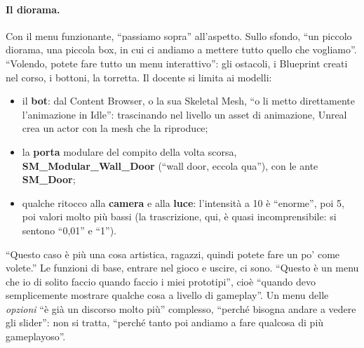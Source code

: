 \paragraph{Il diorama.} Con il menu funzionante, ``passiamo sopra'' all'aspetto. Sullo
sfondo, ``un piccolo diorama, una piccola box, in cui ci andiamo a mettere tutto quello che
vogliamo''. ``Volendo, potete fare tutto un menu interattivo'': gli ostacoli, i Blueprint
creati nel corso, i bottoni, la torretta. Il docente si limita ai modelli:
\begin{itemize}
  \item il \textbf{bot}: dal Content Browser, o la sua Skeletal Mesh, ``o li metto
        direttamente l'animazione in Idle'': trascinando nel livello un asset di animazione,
        Unreal crea un actor con la mesh che la riproduce;
  \item la \textbf{porta} modulare del compito della volta scorsa, \textbf{SM\_Modular\_\allowbreak Wall\_Door}
        (``wall door, eccola qua''), con le ante \textbf{SM\_Door};
  \item qualche ritocco alla \textbf{camera} e alla \textbf{luce}: l'intensità a 10 è
        ``enorme'', poi 5, poi valori molto più bassi (la trascrizione, qui, è quasi
        incomprensibile: si sentono ``0,01'' e ``1'').
\end{itemize}
``Questo caso è più una cosa artistica, ragazzi, quindi potete fare un po' come volete.''
Le funzioni di base, entrare nel gioco e uscire, ci sono. ``Questo è un menu che io di
solito faccio quando faccio i miei prototipi'', cioè ``quando devo semplicemente mostrare
qualche cosa a livello di gameplay''. Un menu delle \emph{opzioni} ``è già un discorso
molto più'' complesso, ``perché bisogna andare a vedere gli slider'': non si tratta, ``perché
tanto poi andiamo a fare qualcosa di più gameplayoso''.

